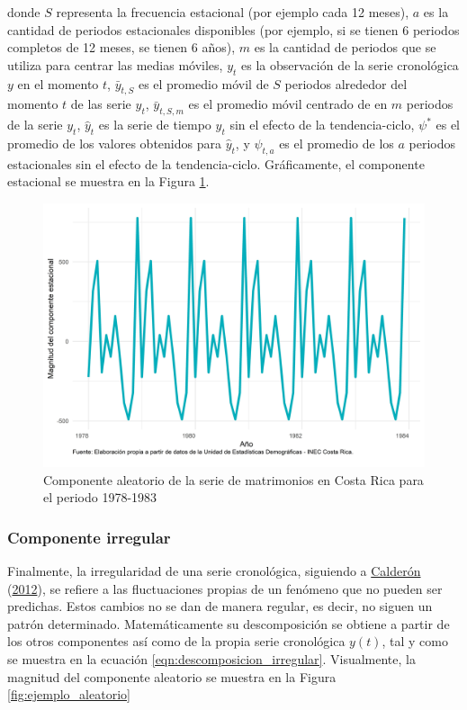 \documentclass[
]{article}
\begin{document}
donde \(S\) representa la frecuencia estacional (por ejemplo cada 12
meses), \(a\) es la cantidad de periodos estacionales disponibles (por
ejemplo, si se tienen 6 periodos completos de 12 meses, se tienen 6
años), \(m\) es la cantidad de periodos que se utiliza para centrar las
medias móviles, \(y_t\) es la observación de la serie cronológica \(y\)
en el momento \(t\), \(\bar{y}_{t,S}\) es el promedio móvil de \(S\)
periodos alrededor del momento \(t\) de las serie \(y_t\),
\(\bar{y}_{t,S,m}\) es el promedio móvil centrado de en \(m\) periodos
de la serie \(y_t\), \(\hat{y}_t\) es la serie de tiempo \(y_t\) sin el
efecto de la tendencia-ciclo, \(\psi^*\) es el promedio de los valores
obtenidos para \(\hat{y}_t\), y \(\psi_{t,a}\) es el promedio de los
\(a\) periodos estacionales sin el efecto de la tendencia-ciclo.
Gráficamente, el componente estacional se muestra en la Figura
\ref{fig:ejemplo_estacional}.

\begin{figure}[H]
\includegraphics[width=1\linewidth,height=1\textheight]{Tesis_files/figure-latex/ejemplo_estacional-1} \caption{Componente aleatorio de la serie de matrimonios en Costa Rica para el periodo 1978-1983}\label{fig:ejemplo_estacional}
\end{figure}

\subsubsection{Componente irregular}

Finalmente, la irregularidad de una serie cronológica, siguiendo a
\protect\hyperlink{ref-calderon2012estadistica}{Calderón}
(\protect\hyperlink{ref-calderon2012estadistica}{2012}), se refiere a
las fluctuaciones propias de un fenómeno que no pueden ser predichas.
Estos cambios no se dan de manera regular, es decir, no siguen un patrón
determinado. Matemáticamente su descomposición se obtiene a partir de
los otros componentes así como de la propia serie cronológica \(y(t)\),
tal y como se muestra en la ecuación
\eqref{eqn:descomposicion_irregular}. Visualmente, la magnitud del
componente aleatorio se muestra en la Figura \ref{fig:ejemplo_aleatorio}
\end{document}
